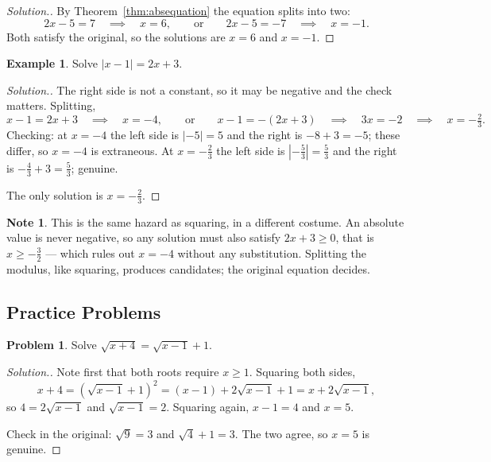 \documentclass[11pt,a4paper]{article}
\theoremstyle{definition}
\newtheorem{example}[thm]{Example}
\newtheorem{note}[thm]{Note}
\newtheorem{problemx}{Problem}[section]
\newenvironment{problem}{\begin{problemx}}{\end{problemx}}
\newenvironment{solution}
  {\renewcommand{\qedsymbol}{}\begin{proof}[\textit{Solution}.]}
  {\end{proof}}
\begin{document}
\begin{solution}
By Theorem~\ref{thm:absequation} the equation splits into two:
$$2x-5=7 \quad\implies\quad x=6,
\qquad\text{or}\qquad
2x-5=-7 \quad\implies\quad x=-1 .$$
Both satisfy the original, so the solutions are $x=6$ and $x=-1$.
\end{solution}

\begin{example}
Solve $\left|x-1\right|=2x+3$.
\end{example}

\begin{solution}
The right side is not a constant, so it may be negative and the check matters.
Splitting,
$$x-1=2x+3 \quad\implies\quad x=-4,
\qquad\text{or}\qquad
x-1=-(2x+3) \quad\implies\quad 3x=-2 \quad\implies\quad x=-\tfrac{2}{3}.$$
Checking: at $x=-4$ the left side is $\left|-5\right|=5$ and the right is
$-8+3=-5$; these differ, so $x=-4$ is extraneous. At $x=-\frac{2}{3}$ the left
side is $\left|-\frac{5}{3}\right|=\frac{5}{3}$ and the right is
$-\frac{4}{3}+3=\frac{5}{3}$; genuine.

The only solution is $x=-\frac{2}{3}$.
\end{solution}

\begin{note}
This is the same hazard as squaring, in a different costume. An absolute value
is never negative, so any solution must also satisfy $2x+3\geq0$, that is
$x\geq-\frac{3}{2}$ --- which rules out $x=-4$ without any substitution.
Splitting the modulus, like squaring, produces candidates; the original equation
decides.
\end{note}

\subsection{Practice Problems}

\begin{problem}
Solve $\sqrt{x+4}=\sqrt{x-1}+1$.
\end{problem}

\begin{solution}
Note first that both roots require $x\geq 1$. Squaring both sides,
$$x+4=\left(\sqrt{x-1}+1\right)^{2}=(x-1)+2\sqrt{x-1}+1=x+2\sqrt{x-1},$$
so $4=2\sqrt{x-1}$ and $\sqrt{x-1}=2$. Squaring again, $x-1=4$ and $x=5$.

Check in the original: $\sqrt{9}=3$ and $\sqrt{4}+1=3$. The two agree, so $x=5$ is
genuine.
\end{solution}
\end{document}
